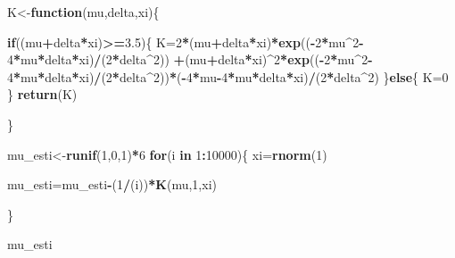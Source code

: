 \documentclass[]{article}
\newenvironment{Shaded}{\begin{snugshade}}{\end{snugshade}}
\newcommand{\KeywordTok}[1]{\textcolor[rgb]{0.13,0.29,0.53}{\textbf{#1}}}
\newcommand{\DecValTok}[1]{\textcolor[rgb]{0.00,0.00,0.81}{#1}}
\newcommand{\FloatTok}[1]{\textcolor[rgb]{0.00,0.00,0.81}{#1}}
\newcommand{\ControlFlowTok}[1]{\textcolor[rgb]{0.13,0.29,0.53}{\textbf{#1}}}
\newcommand{\OperatorTok}[1]{\textcolor[rgb]{0.81,0.36,0.00}{\textbf{#1}}}
\newcommand{\NormalTok}[1]{#1}
\begin{document}
\begin{Shaded}
\begin{Highlighting}[]
\NormalTok{K<-}\ControlFlowTok{function}\NormalTok{(mu,delta,xi)\{}
  
  \ControlFlowTok{if}\NormalTok{((mu}\OperatorTok{+}\NormalTok{delta}\OperatorTok{*}\NormalTok{xi)}\OperatorTok{>=}\FloatTok{3.5}\NormalTok{)\{}
\NormalTok{  K=}\DecValTok{2}\OperatorTok{*}\NormalTok{(mu}\OperatorTok{+}\NormalTok{delta}\OperatorTok{*}\NormalTok{xi)}\OperatorTok{*}\KeywordTok{exp}\NormalTok{((}\OperatorTok{-}\DecValTok{2}\OperatorTok{*}\NormalTok{mu}\OperatorTok{^}\DecValTok{2}\OperatorTok{-}\DecValTok{4}\OperatorTok{*}\NormalTok{mu}\OperatorTok{*}\NormalTok{delta}\OperatorTok{*}\NormalTok{xi)}\OperatorTok{/}\NormalTok{(}\DecValTok{2}\OperatorTok{*}\NormalTok{delta}\OperatorTok{^}\DecValTok{2}\NormalTok{)) }\OperatorTok{+}\NormalTok{(mu}\OperatorTok{+}\NormalTok{delta}\OperatorTok{*}\NormalTok{xi)}\OperatorTok{^}\DecValTok{2}\OperatorTok{*}\KeywordTok{exp}\NormalTok{((}\OperatorTok{-}\DecValTok{2}\OperatorTok{*}\NormalTok{mu}\OperatorTok{^}\DecValTok{2}\OperatorTok{-}\DecValTok{4}\OperatorTok{*}\NormalTok{mu}\OperatorTok{*}\NormalTok{delta}\OperatorTok{*}\NormalTok{xi)}\OperatorTok{/}\NormalTok{(}\DecValTok{2}\OperatorTok{*}\NormalTok{delta}\OperatorTok{^}\DecValTok{2}\NormalTok{))}\OperatorTok{*}\NormalTok{(}\OperatorTok{-}\DecValTok{4}\OperatorTok{*}\NormalTok{mu}\OperatorTok{-}\DecValTok{4}\OperatorTok{*}\NormalTok{mu}\OperatorTok{*}\NormalTok{delta}\OperatorTok{*}\NormalTok{xi)}\OperatorTok{/}\NormalTok{(}\DecValTok{2}\OperatorTok{*}\NormalTok{delta}\OperatorTok{^}\DecValTok{2}\NormalTok{)}
\NormalTok{  \}}\ControlFlowTok{else}\NormalTok{\{}
\NormalTok{    K=}\DecValTok{0}
\NormalTok{  \}}
  \KeywordTok{return}\NormalTok{(K)}
  
\NormalTok{\}}


\NormalTok{mu_esti<-}\KeywordTok{runif}\NormalTok{(}\DecValTok{1}\NormalTok{,}\DecValTok{0}\NormalTok{,}\DecValTok{1}\NormalTok{)}\OperatorTok{*}\DecValTok{6}
\ControlFlowTok{for}\NormalTok{(i }\ControlFlowTok{in} \DecValTok{1}\OperatorTok{:}\DecValTok{10000}\NormalTok{)\{}
\NormalTok{  xi=}\KeywordTok{rnorm}\NormalTok{(}\DecValTok{1}\NormalTok{)}
  
  
\NormalTok{  mu_esti=mu_esti}\OperatorTok{-}\NormalTok{(}\DecValTok{1}\OperatorTok{/}\NormalTok{(i))}\OperatorTok{*}\KeywordTok{K}\NormalTok{(mu,}\DecValTok{1}\NormalTok{,xi)}
  
\NormalTok{\}}

\NormalTok{mu_esti}
\end{Highlighting}
\end{Shaded}
\end{document}
